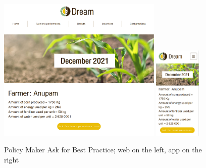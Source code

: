 \documentclass{article}
\begin{document}
        \begin{figure} [h]
            \centering
            \includegraphics[width=0.7\textwidth]{images/UserInterfaces/PolicyMaker/FarmersPerformance/AskButtonWeb.png}
            \quad
            \includegraphics[width=0.2\textwidth]{images/UserInterfaces/PolicyMaker/FarmersPerformance/AskButtonApp.png}
            \quad
            \caption{\label{fig:policyMakerAskBestPracticesFarmersPerformance}Policy Maker Ask for Best Practice; web on the left, app on the right}
        \end{figure}
    
    \newpage
    
\end{document}
